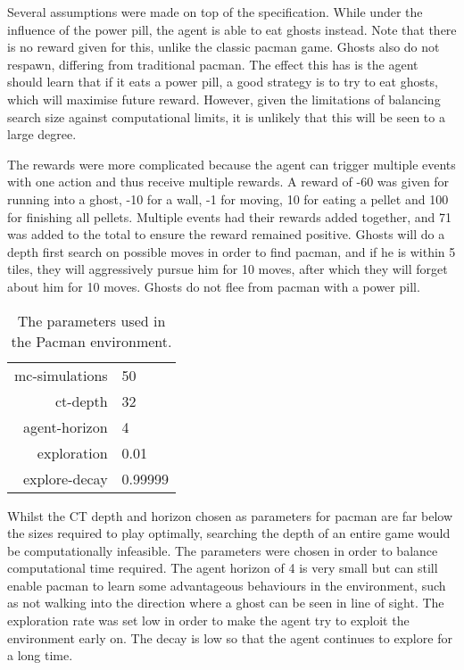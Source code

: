 \documentclass[pdftex,twoside,a4paper]{report}
\begin{document}
Several assumptions were made on top of the specification.  While under the influence of the power pill, the agent is able to eat ghosts instead. Note that there is no reward given for this, unlike the classic pacman game. Ghosts also do not respawn, differing from traditional pacman. The effect this has is the agent should learn that if it eats a power pill, a good strategy is to try to eat ghosts, which will maximise future reward. However, given the limitations of balancing search size against computational limits, it is unlikely that this will be seen to a large degree.

The rewards were more complicated because the agent can trigger multiple events with one action and thus receive multiple rewards. A reward of -60 was given for running into a ghost, -10 for a wall, -1 for moving, 10 for eating a pellet and 100 for finishing all pellets. Multiple events had their rewards added together, and 71 was added to the total to ensure the reward remained positive. Ghosts will do a depth first search on possible moves in order to find pacman, and if he is within 5 tiles, they will aggressively pursue him for 10 moves, after which they will forget about him for 10 moves. Ghosts do not flee from pacman with a power pill.

\begin{table}[h]
\begin{center}
\begin{tabular}{| r | l | }
\hline
mc-simulations & 50\\
ct-depth & 32\\
agent-horizon & 4\\
exploration & 0.01\\
explore-decay & 0.99999\\
\hline
\end{tabular}
\caption{The parameters used in the Pacman environment.}
\end{center}
\end{table}

Whilst the CT depth and horizon chosen as parameters for pacman are far below the sizes required to play optimally, searching the depth of an entire game would be computationally infeasible. The parameters were chosen in order to balance computational time required. The agent horizon of 4 is very small but can still enable pacman to learn some advantageous behaviours in the environment, such as not walking into the direction where a ghost can be seen in line of sight. The exploration rate was set low in order to make the agent try to exploit the environment early on. The decay is low so that the agent continues to explore for a long time.
\end{document}
